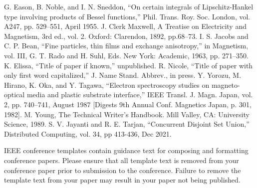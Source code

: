 \documentclass[conference]{IEEEtran}
\begin{document}
\begin{thebibliography}{00}
 G. Eason, B. Noble, and I. N. Sneddon, ``On certain integrals of Lipschitz-Hankel type involving products of Bessel functions,'' Phil. Trans. Roy. Soc. London, vol. A247, pp. 529--551, April 1955.
 J. Clerk Maxwell, A Treatise on Electricity and Magnetism, 3rd ed., vol. 2. Oxford: Clarendon, 1892, pp.68--73.
 I. S. Jacobs and C. P. Bean, ``Fine particles, thin films and exchange anisotropy,'' in Magnetism, vol. III, G. T. Rado and H. Suhl, Eds. New York: Academic, 1963, pp. 271--350.
 K. Elissa, ``Title of paper if known,'' unpublished.
 R. Nicole, ``Title of paper with only first word capitalized,'' J. Name Stand. Abbrev., in press.
 Y. Yorozu, M. Hirano, K. Oka, and Y. Tagawa, ``Electron spectroscopy studies on magneto-optical media and plastic substrate interface,'' IEEE Transl. J. Magn. Japan, vol. 2, pp. 740--741, August 1987 [Digests 9th Annual Conf. Magnetics Japan, p. 301, 1982].
 M. Young, The Technical Writer's Handbook. Mill Valley, CA: University Science, 1989.
 S. V. Jayanti and R. E. Tarjan, ``Concurrent Disjoint Set Union,'' Distributed Computing, vol. 34, pp 413-436, Dec 2021.
\end{thebibliography}
\vspace{12pt}
\color{red}
IEEE conference templates contain guidance text for composing and formatting conference papers. Please ensure that all template text is removed from your conference paper prior to submission to the conference. Failure to remove the template text from your paper may result in your paper not being published.
\end{document}
